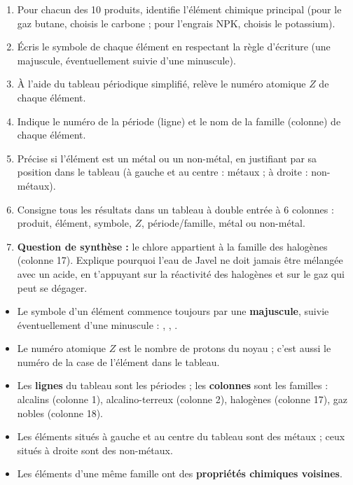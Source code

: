 \documentclass[11pt]{article}
\newcommand{\cle}[1]{{\popxbold\color{popdark}#1}}
\newcounter{popsec}
\newcounter{popsub}
\newcommand{\courssub}[1]{%
  \stepcounter{popsub}%
  \par\vspace{9pt}\noindent{\popxbold\fontsize{11.5}{13}\selectfont\color{popink}{\color{poporange}\thepopsec.\thepopsub}\hspace{6pt}#1}\par\nopagebreak\vspace{4pt}
}
\begin{document}
\begin{enumerate}
\item Pour chacun des 10 produits, identifie l'\cle{élément chimique} principal (pour le gaz butane, choisis le carbone ; pour l'engrais NPK, choisis le potassium).
\item Écris le \cle{symbole} de chaque élément en respectant la règle d'écriture (une majuscule, éventuellement suivie d'une minuscule).
\item À l'aide du tableau périodique simplifié, relève le \cle{numéro atomique} $Z$ de chaque élément.
\item Indique le numéro de la \cle{période} (ligne) et le nom de la \cle{famille} (colonne) de chaque élément.
\item Précise si l'élément est un \cle{métal} ou un \cle{non-métal}, en justifiant par sa position dans le tableau (à gauche et au centre : métaux ; à droite : non-métaux).
\item Consigne tous les résultats dans un tableau à double entrée à 6 colonnes : produit, élément, symbole, $Z$, période/famille, métal ou non-métal.
\item \textbf{Question de synthèse :} le chlore appartient à la famille des halogènes (colonne 17). Explique pourquoi l'eau de Javel ne doit jamais être mélangée avec un acide, en t'appuyant sur la réactivité des halogènes et sur le gaz  qui peut se dégager.
\end{enumerate}

\courssub{Ressources à mobiliser}

\begin{aretenir}
\begin{itemize}
\item Le \cle{symbole} d'un élément commence toujours par une \textbf{majuscule}, suivie éventuellement d'une minuscule : , , .
\item Le \cle{numéro atomique} $Z$ est le nombre de protons du noyau ; c'est aussi le numéro de la case de l'élément dans le tableau.
\item Les \textbf{lignes} du tableau sont les \cle{périodes} ; les \textbf{colonnes} sont les \cle{familles} : alcalins (colonne 1), alcalino-terreux (colonne 2), halogènes (colonne 17), gaz nobles (colonne 18).
\item Les éléments situés à gauche et au centre du tableau sont des \cle{métaux} ; ceux situés à droite sont des \cle{non-métaux}.
\item Les éléments d'une même famille ont des \textbf{propriétés chimiques voisines}.
\end{itemize}
\end{aretenir}
\end{document}
